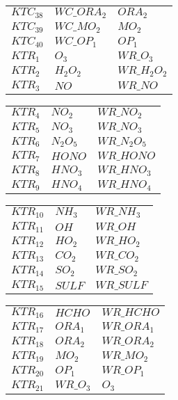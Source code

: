 {\begin{tabular}{l@{\,:\,}p{0.2\chfwidth}@{$\quad\longrightarrow\quad$}p{0.6\chfwidth}}
$KTC_{38}$ & $WC\_ORA_{2}$ & $ORA_{2}$ \\
$KTC_{39}$ & $WC\_MO_{2}$ & $MO_{2}$ \\
$KTC_{40}$ & $WC\_OP_{1}$ & $OP_{1}$ \\
$KTR_{1}$ & $O_{3}$ & $WR\_O_{3}$ \\
$KTR_{2}$ & $H_{2}O_{2}$ & $WR\_H_{2}O_{2}$ \\
$KTR_{3}$ & $NO$ & $WR\_NO$ \\
\end{tabular}
 
\begin{tabular}{l@{\,:\,}p{0.2\chfwidth}@{$\quad\longrightarrow\quad$}p{0.6\chfwidth}}
$KTR_{4}$ & $NO_{2}$ & $WR\_NO_{2}$ \\
$KTR_{5}$ & $NO_{3}$ & $WR\_NO_{3}$ \\
$KTR_{6}$ & $N_{2}O_{5}$ & $WR\_N_{2}O_{5}$ \\
$KTR_{7}$ & $HONO$ & $WR\_HONO$ \\
$KTR_{8}$ & $HNO_{3}$ & $WR\_HNO_{3}$ \\
$KTR_{9}$ & $HNO_{4}$ & $WR\_HNO_{4}$ \\
\end{tabular}
 
\begin{tabular}{l@{\,:\,}p{0.2\chfwidth}@{$\quad\longrightarrow\quad$}p{0.6\chfwidth}}
$KTR_{10}$ & $NH_{3}$ & $WR\_NH_{3}$ \\
$KTR_{11}$ & $OH$ & $WR\_OH$ \\
$KTR_{12}$ & $HO_{2}$ & $WR\_HO_{2}$ \\
$KTR_{13}$ & $CO_{2}$ & $WR\_CO_{2}$ \\
$KTR_{14}$ & $SO_{2}$ & $WR\_SO_{2}$ \\
$KTR_{15}$ & $SULF$ & $WR\_SULF$ \\
\end{tabular}
 
\begin{tabular}{l@{\,:\,}p{0.2\chfwidth}@{$\quad\longrightarrow\quad$}p{0.6\chfwidth}}
$KTR_{16}$ & $HCHO$ & $WR\_HCHO$ \\
$KTR_{17}$ & $ORA_{1}$ & $WR\_ORA_{1}$ \\
$KTR_{18}$ & $ORA_{2}$ & $WR\_ORA_{2}$ \\
$KTR_{19}$ & $MO_{2}$ & $WR\_MO_{2}$ \\
$KTR_{20}$ & $OP_{1}$ & $WR\_OP_{1}$ \\
$KTR_{21}$ & $WR\_O_{3}$ & $O_{3}$ \\
\end{tabular}
 
}
